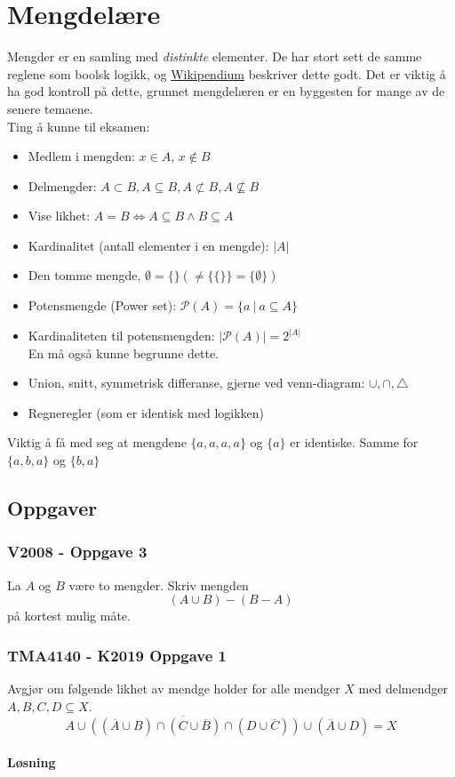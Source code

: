 \section{Mengdelære}

Mengder er en samling med \textit{distinkte} elementer. De har stort sett de samme reglene
som boolsk logikk, og \href{https://www.wikipendium.no/MA0301_Elementary_Discrete_Mathematics#sets}{Wikipendium} beskriver dette godt.
Det er viktig å ha god kontroll på dette, grunnet mengdelæren er en byggesten for mange av de senere temaene.\\
Ting å kunne til eksamen:
\begin{itemize}
    \item Medlem i mengden: \(x\in A\), \(x\not\in B\)
    \item Delmengder: \(A \subset B, A\subseteq B, A\not\subset B, A \not\subseteq B\)
    \item Vise likhet: \(A=B \Leftrightarrow A\subseteq B \land B \subseteq A\)
    \item Kardinalitet (antall elementer i en mengde): \(|A|\)
    \item Den tomme mengde, \(\emptyset = \{\} \left(\neq \{\{\}\} = \{\emptyset\}\right)\)
    \item Potensmengde (Power set): \(\mathcal{P}(A) = \{a ~|~ a \subseteq A\}\)
    \item Kardinaliteten til potensmengden: \(|\mathcal{P}(A)| = 2^{|A|}\)\\
    En må også kunne begrunne dette.
    \item Union, snitt, symmetrisk differanse, gjerne ved venn-diagram: \(\cup, \cap, \triangle\)
    \item Regneregler (som er identisk med logikken)
\end{itemize}

\noindent Viktig å få med seg at mengdene \(\{a, a, a, a\}\) og \(\{a\}\) er identiske. Samme for \(\{a, b, a\}\) og \(\{b, a\}\)

\subsection{Oppgaver}

\subsubsection{V2008 - Oppgave 3}
La $A$ og $B$ være to mengder. Skriv mengden
\[
(A\cup B)-(B-A)    
\]
på kortest mulig måte.

\subsubsection{TMA4140 - K2019 Oppgave 1}

Avgjør om følgende likhet av mendge holder for alle mendger $X$ med
delmendger $A,B,C,D \subseteq X$.
\[
\overline{A \cup ((\overline{A} \cup B)\cap (C\cup \overline{B})\cap (D\cup \overline{C}))} \cup (\overline{A} \cup D) = X   
\]

\paragraph*{Løsning} %